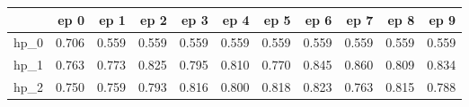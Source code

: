\begin{tabular}{lrrrrrrrrrr}
\toprule
{} &   ep 0 &   ep 1 &   ep 2 &   ep 3 &   ep 4 &   ep 5 &   ep 6 &   ep 7 &   ep 8 &   ep 9 \\
\midrule
hp\_0 &  0.706 &  0.559 &  0.559 &  0.559 &  0.559 &  0.559 &  0.559 &  0.559 &  0.559 &  0.559 \\
hp\_1 &  0.763 &  0.773 &  0.825 &  0.795 &  0.810 &  0.770 &  0.845 &  0.860 &  0.809 &  0.834 \\
hp\_2 &  0.750 &  0.759 &  0.793 &  0.816 &  0.800 &  0.818 &  0.823 &  0.763 &  0.815 &  0.788 \\
\bottomrule
\end{tabular}

